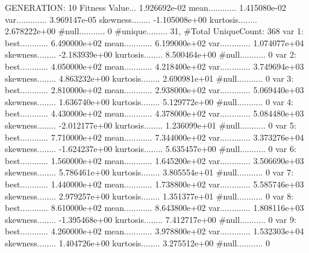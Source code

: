 \documentclass[oneside,letterpaper,titlepage]{article}
\begin{document}
\begin{Schunk}
\begin{Soutput}
GENERATION: 10
Fitness Value... 1.926692e-02
mean............ 1.415080e-02
var............. 3.969147e-05
skewness........ -1.105008e+00
kurtosis........ 2.678222e+00
#null........... 0
#unique......... 31, #Total UniqueCount: 368
var 1:
best............ 6.490000e+02
mean............ 6.199000e+02
var............. 1.074077e+04
skewness........ -2.183939e+00
kurtosis........ 8.500464e+00
#null........... 0
var 2:
best............ 4.050000e+02
mean............ 4.218400e+02
var............. 3.749694e+03
skewness........ 4.863232e+00
kurtosis........ 2.690981e+01
#null........... 0
var 3:
best............ 2.810000e+02
mean............ 2.938000e+02
var............. 5.069440e+03
skewness........ 1.636740e+00
kurtosis........ 5.129772e+00
#null........... 0
var 4:
best............ 4.430000e+02
mean............ 4.378000e+02
var............. 5.084480e+03
skewness........ -2.012177e+00
kurtosis........ 1.236099e+01
#null........... 0
var 5:
best............ 7.710000e+02
mean............ 7.344000e+02
var............. 3.373276e+04
skewness........ -1.624237e+00
kurtosis........ 5.635457e+00
#null........... 0
var 6:
best............ 1.560000e+02
mean............ 1.645200e+02
var............. 3.506690e+03
skewness........ 5.786461e+00
kurtosis........ 3.805554e+01
#null........... 0
var 7:
best............ 1.440000e+02
mean............ 1.738800e+02
var............. 5.585746e+03
skewness........ 2.979257e+00
kurtosis........ 1.351377e+01
#null........... 0
var 8:
best............ 8.610000e+02
mean............ 8.643800e+02
var............. 1.808116e+03
skewness........ -1.395468e+00
kurtosis........ 7.412717e+00
#null........... 0
var 9:
best............ 4.260000e+02
mean............ 3.978800e+02
var............. 1.532303e+04
skewness........ 1.404726e+00
kurtosis........ 3.275512e+00
#null........... 0


\end{Soutput}
\end{Schunk}
\end{document}
